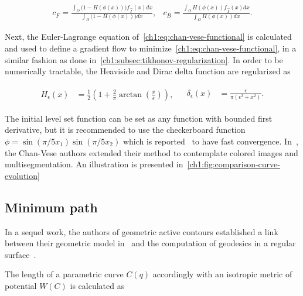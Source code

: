 \[
\begin{array}{ll}
	\displaystyle c_F = \frac{\int_{\Omega}{\big(1-H(\phi(x))\big)f_{\vec{I}}(x)dx}}{\int_{\Omega}{\big(1-H(\phi(x))\big)dx}}, & 	
	\displaystyle c_B = \frac{\int_{\Omega}{H(\phi(x))f_{\vec{I}}(x)dx}}{\int_{\Omega}{H(\phi(x))dx}}.
\end{array}
\]

Next, the Euler-Lagrange equation of~\cref{ch1:eq:chan-vese-functional} is calculated and used to define a gradient flow to minimize~\cref{ch1:eq:chan-vese-functional}, in a similar fashion as done in~\cref{ch1:subsec:tikhonov-regularization}. In order to be numerically tractable, the Heaviside and Dirac delta function are regularized as 

\[
\begin{array}{ll}

	\begin{array}{ll}
		\displaystyle H_{\epsilon}(x) &= \displaystyle \frac{1}{2}\left( 1 + \frac{2}{\pi}\arctan(\frac{x}{\epsilon}) \right),
	\end{array} & 
	
	\begin{array}{ll}
		\displaystyle \delta_{\epsilon}(x) &= \displaystyle \frac{\epsilon}{\pi(\epsilon^2 + x^2)}.
	\end{array}	

\end{array}
\]

The initial level set function can be set as any function with bounded first derivative, but it is recommended to use the checkerboard function $\phi=\sin(\pi/5 x_1)\sin(\pi/5x_2)$ which is reported~\cite{getreuer12} to have fast convergence. In~\cite{vese02}, the Chan-Vese authors extended their method to contemplate colored images and multisegmentation. An illustration is presented in~\cref{ch1:fig:comparison-curve-evolution}




\subsection{Minimum path}

In a sequel work, the authors of geometric active contours established a link between their geometric model in~\cite{caselles93} and the computation of geodesics in a regular surface~\cite{caselles97}. 

The length of a parametric curve $C(q)$ accordingly with an isotropic metric of potential $W(C)$ is calculated as 

